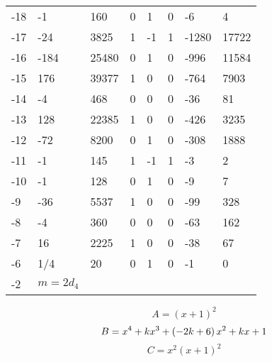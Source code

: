 \documentclass{amsart}
\begin{document}
\begin{longtable}{|l|l|l|lllll|}
-18&-1&160&0&1&0&-6&4\\
-17&-24&3825&1&-1&1&-1280&17722\\
-16&-184&25480&0&1&0&-996&11584\\
-15&176&39377&1&0&0&-764&7903\\
-14&-4&468&0&0&0&-36&81\\
-13&128&22385&1&0&0&-426&3235\\
-12&-72&8200&0&1&0&-308&1888\\
-11&-1&145&1&-1&1&-3&2\\
-10&-1&128&0&1&0&-9&7\\
-9&-36&5537&1&0&0&-99&328\\
-8&-4&360&0&0&0&-63&162\\
-7&16&2225&1&0&0&-38&67\\
-6&1/4&20&0&1&0&-1&0\\
-2&$m=2d_{4}$&&\multicolumn{5}{c|}{}\\
\hline
\end{longtable}
$$A=(x
 + 1)^{2}$$
$$B=x^4
 + k\*x^3
 + \left(-2\*k
 + 6\right) \*x^2
 + k\*x
 + 1$$
$$C=x^2(x
 + 1)^{2}$$
\end{document}

